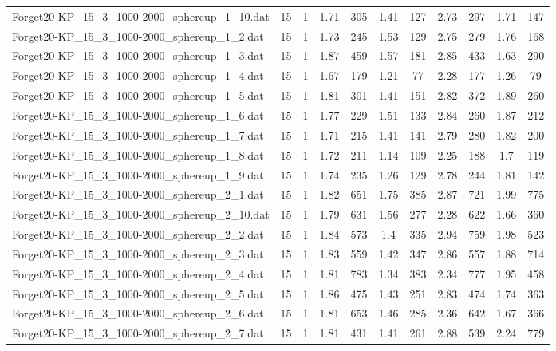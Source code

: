 \begin{table}[!ht]
\begin{tabular}{lcccccccccc}
Forget20-KP\_15\_3\_1000-2000\_sphereup\_1\_10.dat & 15 & 1 & 1.71 & 305 & 1.41 & 127 & 2.73 & 297 & 1.71 & 147 \\
Forget20-KP\_15\_3\_1000-2000\_sphereup\_1\_2.dat & 15 & 1 & 1.73 & 245 & 1.53 & 129 & 2.75 & 279 & 1.76 & 168 \\
Forget20-KP\_15\_3\_1000-2000\_sphereup\_1\_3.dat & 15 & 1 & 1.87 & 459 & 1.57 & 181 & 2.85 & 433 & 1.63 & 290 \\
Forget20-KP\_15\_3\_1000-2000\_sphereup\_1\_4.dat & 15 & 1 & 1.67 & 179 & 1.21 & 77 & 2.28 & 177 & 1.26 & 79 \\
Forget20-KP\_15\_3\_1000-2000\_sphereup\_1\_5.dat & 15 & 1 & 1.81 & 301 & 1.41 & 151 & 2.82 & 372 & 1.89 & 260 \\
Forget20-KP\_15\_3\_1000-2000\_sphereup\_1\_6.dat & 15 & 1 & 1.77 & 229 & 1.51 & 133 & 2.84 & 260 & 1.87 & 212 \\
Forget20-KP\_15\_3\_1000-2000\_sphereup\_1\_7.dat & 15 & 1 & 1.71 & 215 & 1.41 & 141 & 2.79 & 280 & 1.82 & 200 \\
Forget20-KP\_15\_3\_1000-2000\_sphereup\_1\_8.dat & 15 & 1 & 1.72 & 211 & 1.14 & 109 & 2.25 & 188 & 1.7 & 119 \\
Forget20-KP\_15\_3\_1000-2000\_sphereup\_1\_9.dat & 15 & 1 & 1.74 & 235 & 1.26 & 129 & 2.78 & 244 & 1.81 & 142 \\
Forget20-KP\_15\_3\_1000-2000\_sphereup\_2\_1.dat & 15 & 1 & 1.82 & 651 & 1.75 & 385 & 2.87 & 721 & 1.99 & 775 \\
Forget20-KP\_15\_3\_1000-2000\_sphereup\_2\_10.dat & 15 & 1 & 1.79 & 631 & 1.56 & 277 & 2.28 & 622 & 1.66 & 360 \\
Forget20-KP\_15\_3\_1000-2000\_sphereup\_2\_2.dat & 15 & 1 & 1.84 & 573 & 1.4 & 335 & 2.94 & 759 & 1.98 & 523 \\
Forget20-KP\_15\_3\_1000-2000\_sphereup\_2\_3.dat & 15 & 1 & 1.83 & 559 & 1.42 & 347 & 2.86 & 557 & 1.88 & 714 \\
Forget20-KP\_15\_3\_1000-2000\_sphereup\_2\_4.dat & 15 & 1 & 1.81 & 783 & 1.34 & 383 & 2.34 & 777 & 1.95 & 458 \\
Forget20-KP\_15\_3\_1000-2000\_sphereup\_2\_5.dat & 15 & 1 & 1.86 & 475 & 1.43 & 251 & 2.83 & 474 & 1.74 & 363 \\
Forget20-KP\_15\_3\_1000-2000\_sphereup\_2\_6.dat & 15 & 1 & 1.81 & 653 & 1.46 & 285 & 2.36 & 642 & 1.67 & 366 \\
Forget20-KP\_15\_3\_1000-2000\_sphereup\_2\_7.dat & 15 & 1 & 1.81 & 431 & 1.41 & 261 & 2.88 & 539 & 2.24 & 779 \\

\end{tabular}
\end{table}
